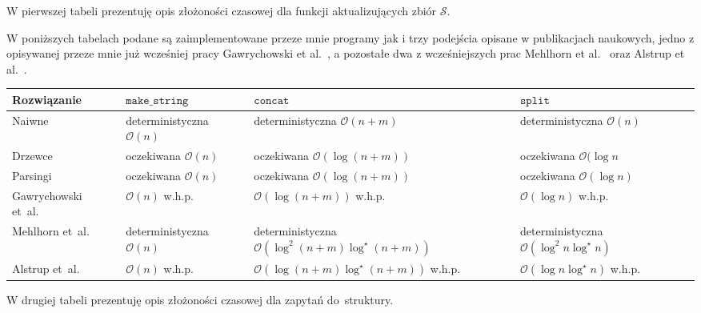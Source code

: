 \documentclass[declaration,shortabstract]{iithesis}
\theoremstyle{definition} \newtheorem{definition}{Definicja}[chapter]
\theoremstyle{plain} \newtheorem{remark}[definition]{Obserwacja}
\theoremstyle{plain} \newtheorem{theorem}[definition]{Twierdzenie}
\theoremstyle{plain} \newtheorem{example}{Przykład}[definition]
\theoremstyle{plain} \newtheorem{lemma}[definition]{Lemat}
\begin{document}
W pierwszej tabeli prezentuję opis złożoności czasowej dla funkcji aktualizujących zbiór $\mathcal{S}$. 

W poniższych tabelach podane są zaimplementowane przeze mnie programy jak i trzy podejścia opisane w publikacjach naukowych, jedno z opisywanej przeze mnie już wcześniej pracy Gawrychowski et al.~\cite{gawrychowski}, a pozostałe dwa z wcześniejszych prac Mehlhorn et al.~\cite{mehlhorn} oraz Alstrup et al.~\cite{alstrup}.

\begin{center}
    \begin{tabular}{ | m{2.3cm} | >{\centering\arraybackslash}m{2.8cm} | >{\centering\arraybackslash}m{4.5cm} | >{\centering\arraybackslash}m{2.8cm} | }
        \hline 
        Rozwiązanie & $\texttt{make\_string}$ & $\texttt{concat}$ & $\texttt{split}$ \\
        \hline
        Naiwne & deterministyczna $\mathcal{O}(n)$ & deterministyczna $\mathcal{O}(n + m)$ & deterministyczna $\mathcal{O}(n)$ \\
        \hline
        Drzewce & oczekiwana $\mathcal{O}(n)$ & oczekiwana $\mathcal{O}(\log(n + m))$ & oczekiwana $\mathcal{O}(\log n$ \\
        \hline
        Parsingi & oczekiwana $\mathcal{O}(n)$ & oczekiwana $\mathcal{O}(\log(n + m))$ & oczekiwana $\mathcal{O}(\log n)$ \\
        \hline
        Gawrychowski et~al.~\cite{gawrychowski} & $\mathcal{O}(n)$ w.h.p. & $\mathcal{O}(\log(n + m))$ w.h.p. & $\mathcal{O}(\log n)$ w.h.p. \\
        \hline
        Mehlhorn et~al.~\cite{mehlhorn} & deterministyczna $\mathcal{O}(n)$ & deterministyczna $\mathcal{O}(\log^2(n + m)\log^\star(n + m))$ & deterministyczna $\mathcal{O}(\log^2 n \log^\star n)$ \\
        \hline
        Alstrup et~al.~\cite{alstrup} & $\mathcal{O}(n)$ w.h.p. & $\mathcal{O}(\log(n + m)\log^\star(n + m))$ w.h.p. & $\mathcal{O}(\log n \log^\star n)$ w.h.p.\\
        \hline
    \end{tabular}
\end{center}

W drugiej tabeli prezentuję opis złożoności czasowej dla zapytań do~struktury.
\end{document}
